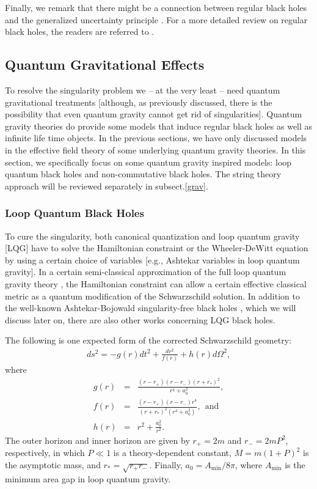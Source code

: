 \documentclass[12pt]{article}
\newcommand{\2}{$^2$}
\newcommand{\3}{$^3$}
\newcommand{\4}{$_4$}
\newcommand{\5}{$_5$}
\begin{document}
Finally, we remark that there might be a connection between regular black holes and the generalized uncertainty principle \cite{1305.3851}. For a more detailed review on regular black holes, the readers are referred to \cite{ansoldi}. 


\subsection{Quantum Gravitational Effects}

To resolve the singularity problem we -- at the very least -- need quantum gravitational treatments [although, as previously discussed, there is the possibility that even quantum gravity cannot get rid of singularities]. Quantum gravity theories do provide some models that induce regular black holes as well as infinite life time objects. In the previous sections, we have only discussed models in the effective field theory of some underlying quantum gravity theories. In this section, we specifically focus on some quantum gravity inspired models: loop quantum black holes and non-commutative black holes. The string theory approach will be reviewed separately in subsect.\ref{grav}.

\subsubsection{Loop Quantum Black Holes}

To cure the singularity, both canonical quantization and loop quantum gravity [LQG] have to solve the Hamiltonian constraint or the Wheeler-DeWitt equation by using a certain choice of variables [e.g., Ashtekar variables in loop quantum gravity]. In a certain semi-classical approximation of the full loop quantum gravity theory \cite{Modesto:2008im}, the Hamiltonian constraint can allow a certain effective classical metric as a quantum modification of the Schwarzschild solution. {\color{black}In addition to the well-known Ashtekar-Bojowald singularity-free black holes \cite{BA}, which we will discuss later on, there are also other works concerning LQG black holes.}

The following is one expected form of the corrected Schwarzschild geometry\cite{Hossenfelder:2009fc}:
\begin{eqnarray}
ds^{2} = - g(r) dt^{2} + \frac{dr^{2}}{f(r)} + h(r) d\Omega^{2},
\end{eqnarray}
where
\begin{eqnarray}
g(r) &=& \frac{(r-r_{+})(r-r_{-})(r+r_{*})^{2}}{r^{4}+a_{0}^{2}},\\
f(r) &=& \frac{(r-r_{+})(r-r_{-})r^{4}}{(r+r_{*})^{2} (r^{4}+a_{0}^{2})}, ~~\text{and}\\
h(r) &=& r^{2} + \frac{a_{0}^{2}}{r^{2}}.
\end{eqnarray}
The outer horizon and inner horizon are given by $r_{+}=2m$ and $r_{-}=2m P^{2}$, respectively, in which $P \ll 1$ is a theory-dependent constant, $M = m (1+P)^{2}$ is the asymptotic mass, and $r_{*}=\sqrt{r_{+}r_{-}}$. Finally, $a_{0} = A_{\mathrm{min}}/8\pi$, where $A_{\mathrm{min}}$ is the minimum area gap in loop quantum gravity.
\end{document}
